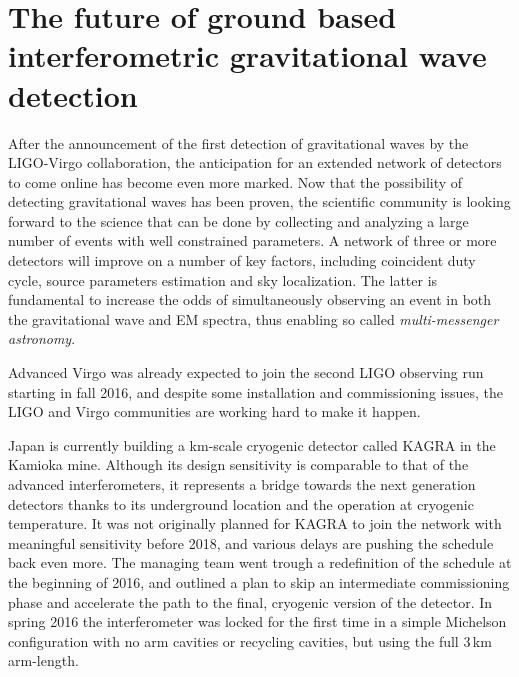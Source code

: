 \section{The future of ground based interferometric gravitational wave detection}\label{subsec:future}

After the announcement of the first detection of gravitational waves by the LIGO-Virgo collaboration, the anticipation for an extended network of detectors to come online has become even more marked.
Now that the possibility of detecting gravitational waves has been proven, the scientific community is looking forward to the science that can be done by collecting and analyzing a large number of events with well constrained parameters.
A network of three or more detectors will improve on a number of key factors, including coincident duty cycle, source parameters estimation and sky localization. The latter is fundamental to increase the odds of simultaneously observing an event in both the gravitational wave and EM spectra, thus enabling so called \textit{multi-messenger astronomy}.

Advanced Virgo was already expected to join the second LIGO observing run starting in fall 2016, and despite some installation and commissioning issues, the LIGO and Virgo communities are working hard to make it happen.

Japan is currently building a km-scale cryogenic detector called KAGRA in the Kamioka mine\cite{Ar2013_PRD_Aso}.
Although its design sensitivity is comparable to that of the advanced interferometers, it represents a bridge towards the next generation detectors thanks to its underground location and the operation at cryogenic temperature.
It was not originally planned for KAGRA to join the network with meaningful sensitivity before 2018, and various delays are pushing the schedule back even more. 
The managing team went trough a redefinition of the schedule at the beginning of 2016, and outlined a plan to skip an intermediate commissioning phase and accelerate the path to the final, cryogenic version of the detector. 
In spring 2016 the interferometer was locked for the first time in a simple Michelson configuration with no arm cavities or recycling cavities, but using the full 3\,km arm-length.

